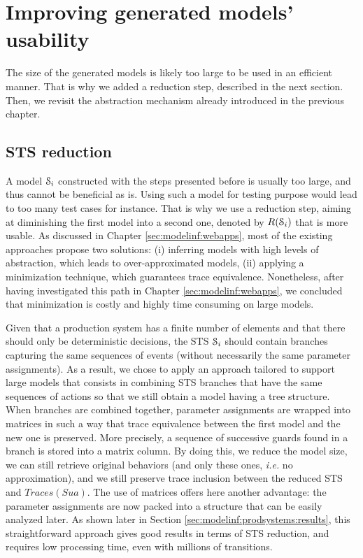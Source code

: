 
\section{Improving generated models' usability}
\label{sec:modelinf:usability}

The size of the generated models is likely too large to be used
in an efficient manner. That is why we added a reduction step,
described in the next section. Then, we revisit the abstraction
mechanism already introduced in the previous chapter.

\subsection{STS reduction}
\label{sec:modelinf:prodsystems:reduction}

A model $\EuScript{S}_i$ constructed with the steps presented
before is usually too large, and thus cannot be beneficial as is.
Using such a model for testing purpose would lead to too many
test cases for instance. That is why we use a reduction step,
aiming at diminishing the first model into a second one, denoted
by $R(\EuScript{S}_i)$ that is more usable. As discussed in
Chapter \ref{sec:modelinf:webapps}, most of the existing
approaches propose two solutions: (i) inferring models with high
levels of abstraction, which leads to over-approximated models,
(ii) applying a minimization technique, which guarantees trace
equivalence.  Nonetheless, after having investigated this path in
Chapter \ref{sec:modelinf:webapps}, we concluded that
minimization is costly and highly time consuming on large models.

Given that a production system has a finite number of elements
and that there should only be deterministic decisions, the STS
$\EuScript{S}_i$ should contain branches capturing the same
sequences of events (without necessarily the same parameter
assignments).  As a result, we chose to apply an approach
tailored to support large models that consists in combining STS
branches that have the same sequences of actions so that we still
obtain a model having a tree structure. When branches are
combined together, parameter assignments are wrapped into
matrices in such a way that trace equivalence between the first
model and the new one is preserved.  More precisely, a sequence
of successive guards found in a branch is stored into a matrix
column. By doing this, we reduce the model size, we can still
retrieve original behaviors (and only these ones, \emph{i.e.} no
approximation), and we still preserve trace inclusion between the
reduced STS and $Traces(Sua)$.
The use of matrices offers here another advantage: the parameter
assignments are now packed into a structure that can be easily
analyzed later. As shown later in Section
\ref{sec:modelinf:prodsystems:results}, this straightforward
approach gives good results in terms of STS reduction, and
requires low processing time, even with millions of transitions.

